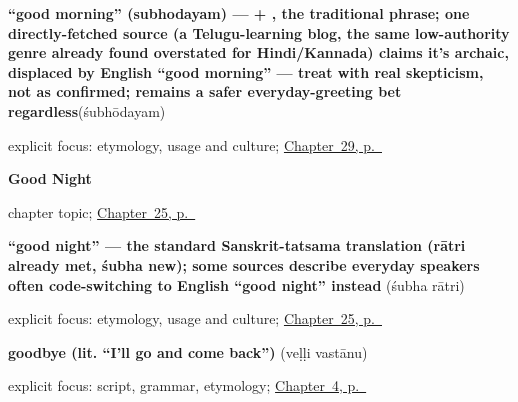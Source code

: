 \noindent\begin{minipage}[t]{\linewidth}
\raggedright
\textbf{\textquotedblleft{}good morning\textquotedblright{} (subhodayam) —  + , the traditional phrase; one directly-fetched source (a Telugu-learning blog, the same low-authority genre already found overstated for Hindi/Kannada) claims it's archaic, displaced by English \textquotedblleft{}good morning\textquotedblright{} — treat with real skepticism, not as confirmed;  remains a safer everyday-greeting bet regardless}\enspace\emph{}\enspace(śubhōdayam)\par
\footnotesize explicit focus: etymology, usage and culture; \hyperref[ch:te-good-morning]{Chapter~29, p.~\pageref*{ch:te-good-morning}}
\end{minipage}\par\smallskip

\noindent\begin{minipage}[t]{\linewidth}
\raggedright
\textbf{Good Night}\par
\footnotesize chapter topic; \hyperref[ch:te-good-night]{Chapter~25, p.~\pageref*{ch:te-good-night}}
\end{minipage}\par\smallskip

\noindent\begin{minipage}[t]{\linewidth}
\raggedright
\textbf{\textquotedblleft{}good night\textquotedblright{} — the standard Sanskrit-tatsama translation (rātri already met, śubha new); some sources describe everyday speakers often code-switching to English \textquotedblleft{}good night\textquotedblright{} instead}\enspace\emph{ }\enspace(śubha rātri)\par
\footnotesize explicit focus: etymology, usage and culture; \hyperref[ch:te-good-night]{Chapter~25, p.~\pageref*{ch:te-good-night}}
\end{minipage}\par\smallskip

\noindent\begin{minipage}[t]{\linewidth}
\raggedright
\textbf{goodbye (lit. \textquotedblleft{}I'll go and come back\textquotedblright{})}\enspace\emph{ }\enspace(veḷḷi vastānu)\par
\footnotesize explicit focus: script, grammar, etymology; \hyperref[ch:farewells]{Chapter~4, p.~\pageref*{ch:farewells}}
\end{minipage}\par\smallskip

